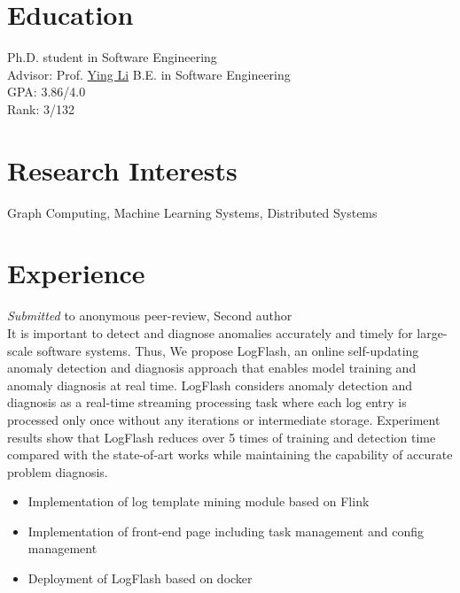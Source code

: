 \documentclass{resume}
\begin{document}



\section{Education}
Ph.D. student in Software Engineering\\
Advisor: Prof. \href{http://www.ss.pku.edu.cn/index.php/teacherteam/teacherlist/1674-%E6%9D%8E%E5%BD%B1}{Ying Li}
B.E. in Software Engineering\\
GPA: 3.86/4.0\\
Rank: 3/132

\section{Research Interests}
Graph Computing, Machine Learning Systems, Distributed Systems

\section{Experience}
\textit{Submitted} to anonymous peer-review, Second author\\
It is important to detect and diagnose anomalies accurately and timely for large-scale software systems. Thus, We propose LogFlash, an online self-updating anomaly detection and diagnosis approach that enables model training and anomaly diagnosis at real time. LogFlash considers anomaly detection and diagnosis as a real-time streaming processing task where each log entry is processed only once without any iterations or intermediate storage. Experiment results show that LogFlash reduces over 5 times of training and detection time compared with the state-of-art works while maintaining the capability of accurate problem diagnosis.
\begin{itemize}
  \item Implementation of log template mining module based on Flink
  \item Implementation of front-end page including task management and config management
  \item Deployment of LogFlash based on docker
\end{itemize}
\end{document}
